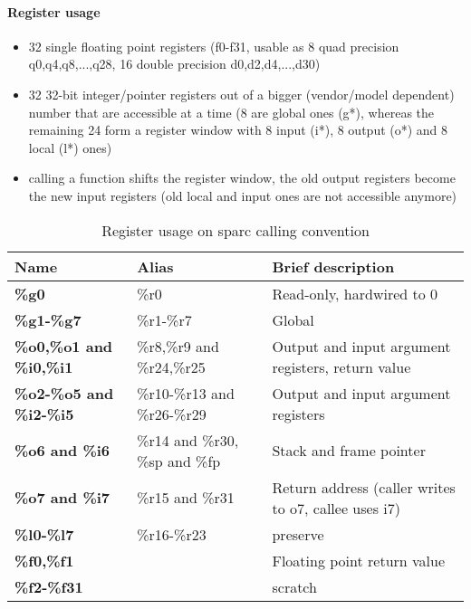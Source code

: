 \paragraph{Register usage}

\begin{itemize}
\item 32 single floating point registers (f0-f31, usable as 8 quad precision q0,q4,q8,...,q28, 16 double precision d0,d2,d4,...,d30)
\item 32 32-bit integer/pointer registers out of a bigger (vendor/model dependent) number that are accessible at a time (8 are global ones (g*), whereas the remaining 24 form a register window with 8 input (i*), 8 output (o*) and 8 local (l*) ones)
\item calling a function shifts the register window, the old output registers become the new input registers (old local and input ones are not accessible anymore)
\end{itemize}

\begin{table}[h]
\begin{tabular*}{0.95\textwidth}{lll}
Name                          & Alias                          & Brief description\\
\hline
{\bf \%g0}                    & \%r0                           & Read-only, hardwired to 0 \\
{\bf \%g1-\%g7}               & \%r1-\%r7                      & Global \\
{\bf \%o0,\%o1 and \%i0,\%i1} & \%r8,\%r9 and \%r24,\%r25      & Output and input argument registers, return value \\
{\bf \%o2-\%o5 and \%i2-\%i5} & \%r10-\%r13 and \%r26-\%r29    & Output and input argument registers \\
{\bf \%o6 and \%i6}           & \%r14 and \%r30, \%sp and \%fp & Stack and frame pointer \\
{\bf \%o7 and \%i7}           & \%r15 and \%r31                & Return address (caller writes to o7, callee uses i7) \\
{\bf \%l0-\%l7}               & \%r16-\%r23                    & preserve \\
{\bf \%f0,\%f1}               &                                & Floating point return value \\
{\bf \%f2-\%f31}              &                                & scratch \\
\end{tabular*}
\caption{Register usage on sparc calling convention}
\end{table}

